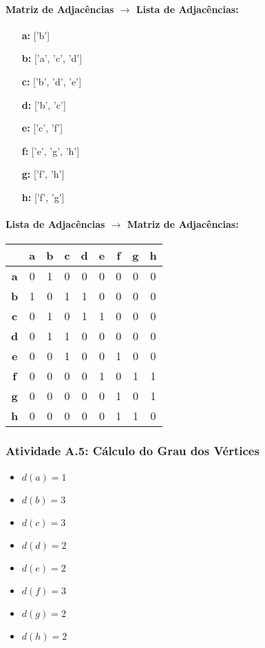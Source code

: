 \documentclass[a4paper,12pt]{article}
\begin{document}
\paragraph*{Matriz de Adjacências $\rightarrow$ Lista de Adjacências:}
\begin{itemize}[leftmargin=*]
    \item[\textbf{a:}] ['b'] \item[\textbf{b:}] ['a', 'c', 'd'] \item[\textbf{c:}] ['b', 'd', 'e'] \item[\textbf{d:}] ['b', 'c']
    \item[\textbf{e:}] ['c', 'f'] \item[\textbf{f:}] ['e', 'g', 'h'] \item[\textbf{g:}] ['f', 'h'] \item[\textbf{h:}] ['f', 'g']
\end{itemize}

\paragraph*{Lista de Adjacências $\rightarrow$ Matriz de Adjacências:}
\begin{center}
\scriptsize
\begin{tabular*}{\textwidth}{c|@{\extracolsep{\fill}}cccccccc}
\rowcolor[gray]{0.9}
 & \textbf{a} & \textbf{b} & \textbf{c} & \textbf{d} & \textbf{e} & \textbf{f} & \textbf{g} & \textbf{h} \\ \hline
\textbf{a} & 0 & 1 & 0 & 0 & 0 & 0 & 0 & 0 \\ \textbf{b} & 1 & 0 & 1 & 1 & 0 & 0 & 0 & 0 \\
\textbf{c} & 0 & 1 & 0 & 1 & 1 & 0 & 0 & 0 \\ \textbf{d} & 0 & 1 & 1 & 0 & 0 & 0 & 0 & 0 \\
\textbf{e} & 0 & 0 & 1 & 0 & 0 & 1 & 0 & 0 \\ \textbf{f} & 0 & 0 & 0 & 0 & 1 & 0 & 1 & 1 \\
\textbf{g} & 0 & 0 & 0 & 0 & 0 & 1 & 0 & 1 \\ \textbf{h} & 0 & 0 & 0 & 0 & 0 & 1 & 1 & 0 \\
\end{tabular*}
\end{center}

\subsubsection*{Atividade A.5: Cálculo do Grau dos Vértices}
\begin{multicols}{3}
\begin{itemize}[nosep]
    \item $d(a) = 1$ \item $d(b) = 3$ \item $d(c) = 3$
    \item $d(d) = 2$ \item $d(e) = 2$ \item $d(f) = 3$
    \item $d(g) = 2$ \item $d(h) = 2$
\end{itemize}
\end{multicols}
\end{document}
